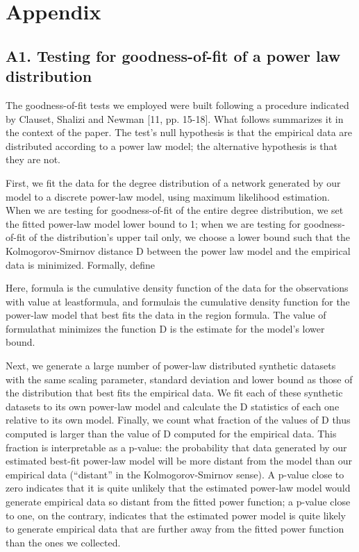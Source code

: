 \section*{Appendix}
\subsection*{A1. Testing for goodness-of-fit of a power law distribution}

The goodness-of-fit tests we employed were built following a procedure indicated by Clauset, Shalizi and Newman [11, pp. 15-18]. What follows summarizes it in the context of the paper. The test's null hypothesis is that the empirical data are distributed according to a power law model; the alternative hypothesis is that they are not.

First, we fit the data for the degree distribution of a network generated by our model to a discrete power-law model, using maximum likelihood estimation. When we are testing for goodness-of-fit of the entire degree distribution, we set the fitted power-law model lower bound to 1; when we are testing for goodness-of-fit of the distribution's upper tail only, we choose a lower bound  such that the Kolmogorov-Smirnov distance D between the power law model and the empirical data is minimized. Formally, define 

Here, formula is the cumulative density function of the data for the observations with value at leastformula, and formulais the cumulative density function for the power-law model that best fits the data in the region formula. The value of formulathat minimizes the function D is the estimate for the model's lower bound.

Next, we generate a large number of power-law distributed synthetic datasets with the same scaling parameter, standard deviation and lower bound as those of the distribution that best fits the empirical data. We fit each of these synthetic datasets to its own power-law model and calculate the D statistics of each one relative to its own model. Finally, we count what fraction of the values of D thus computed is larger than the value of D computed for the empirical data. This fraction is interpretable as a p-value: the probability that data generated by our estimated best-fit power-law model will be more distant from the model than our empirical data (“distant” in the Kolmogorov-Smirnov sense). A p-value close to zero indicates that it is quite unlikely that the estimated power-law model would generate empirical data so distant from the fitted power function; a p-value close to one, on the contrary, indicates that the estimated power model is quite likely to generate empirical data that are further away from the fitted power function than the ones we collected. 

